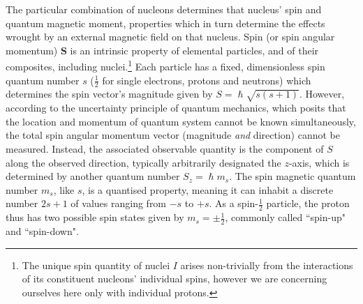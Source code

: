 The particular combination of nucleons determines that nucleus' spin and quantum magnetic moment, properties which in turn determine the effects wrought by an external magnetic field on that nucleus.
Spin (or spin angular momentum) $\mathbf{S}$ is an intrinsic property of elemental particles, and of their composites, including nuclei.\autocite{Eisberg1961}\footnote[2]{The unique spin quantity of nuclei $I$ arises non-trivially from the interactions of its constituent nucleons' individual spins, however we are concerning ourselves here only with individual protons.}
Each particle has a fixed, dimensionless spin quantum number $s$ ($\frac{1}{2}$ for single electrons, protons and neutrons) which determines the spin vector's magnitude given by $S = \hslash \sqrt{s(s+1)}$.
However, according to the uncertainty principle of quantum mechanics, which posits that the location and momentum of quantum system cannot be known simultaneously, the total spin angular momentum vector (magnitude \textit{and} direction) cannot be measured.
Instead, the associated observable quantity is the component of $S$ along the observed direction, typically arbitrarily designated the $z$-axis, which is determined by another quantum number $S_z = \hslash m_s$.
The spin magnetic quantum number $m_s$, like $s$, is a quantised property, meaning it can inhabit a discrete number $2s+1$ of values ranging from $-s$ to $+s$.
As a spin-$\frac{1}{2}$ particle, the proton thus has two possible spin states given by $m_s = \pm \frac{1}{2}$, commonly called ``spin-up" and ``spin-down".

